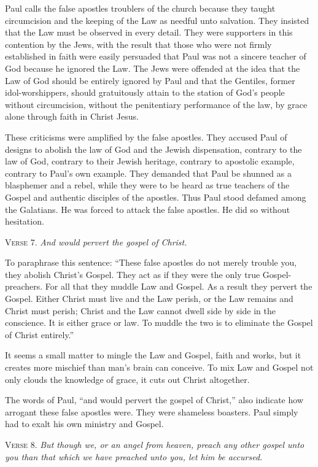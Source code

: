 Paul calls the false apostles troublers of the church because they taught circumcision and the keeping of the Law as needful unto salvation. They insisted that the Law must be observed in every detail. They were supporters in this contention by the Jews, with the result that those who were not firmly established in faith were easily persuaded that Paul was not a sincere teacher of God because he ignored the Law. The Jews were offended at the idea that the Law of God should be entirely ignored by Paul and that the Gentiles, former idol-worshippers, should gratuitously attain to the station of God’s people without circumcision, without the penitentiary performance of the law, by grace alone through faith in Christ Jesus.

These criticisms were amplified by the false apostles. They accused Paul of designs to abolish the law of God and the Jewish dispensation, contrary to the law of God, contrary to their Jewish heritage, contrary to apostolic example, contrary to Paul’s own example. They demanded that Paul be shunned as a blasphemer and a rebel, while they were to be heard as true teachers of the Gospel and authentic disciples of the apostles. Thus Paul stood defamed among the Galatians. He was forced to attack the false apostles. He did so without hesitation.

\textsc{Verse} 7. \emph{And would pervert the gospel of Christ.}

To paraphrase this sentence: “These false apostles do not merely trouble you, they abolish Christ’s Gospel. They act as if they were the only true Gospel-preachers. For all that they muddle Law and Gospel. As a result they pervert the Gospel. Either Christ must live and the Law perish, or the Law remains and Christ must perish; Christ and the Law cannot dwell side by side in the conscience. It is either grace or law. To muddle the two is to eliminate the Gospel of Christ entirely.”

It seems a small matter to mingle the Law and Gospel, faith and works, but it creates more mischief than man’s brain can conceive. To mix Law and Gospel not only clouds the knowledge of grace, it cuts out Christ altogether.

The words of Paul, “and would pervert the gospel of Christ,” also indicate how arrogant these false apostles were. They were shameless boasters. Paul simply had to exalt his own ministry and Gospel.

\textsc{Verse} 8. \emph{But though we, or an angel from heaven, preach any other gospel unto you than that which we have preached unto you, let him be accursed.}

